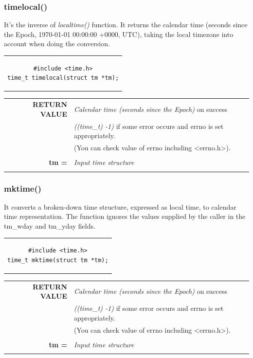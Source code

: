 \subsubsection{timelocal()}
It's the inverse of \textit{localtime()} function. It returns the calendar time (seconds since the Epoch, 1970-01-01 00:00:00 +0000, UTC), taking the local timezone into account when doing the conversion.
\begin{center}
\begin{tabular}{c}
\begin{lstlisting}[linewidth=170pt, basicstyle=\footnotesize\sffamily,]
#include <time.h>
time_t timelocal(struct tm *tm);
\end{lstlisting}
\end{tabular}
\end{center}

\begin{table}[H]
\centering\footnotesize
\begin{tabular}{rl}
\textbf{RETURN VALUE} & {\textit{Calendar time (seconds since the Epoch)} on success}\\
{} & {\textit{((time\_t) -1)} if some error occurs and errno is set appropriately.}\\
{} & {(You can check value of errno including <errno.h>).}\\
& \\
\textbf{tm =} & {\textit{Input time structure}}\\
& \\
\end{tabular}
\end{table}

\subsubsection{mktime()}
It converts a broken-down time structure, expressed as local time, to calendar time representation. The function ignores the values supplied by the caller in the tm\_wday and tm\_yday fields.
\begin{center}
\begin{tabular}{c}
\begin{lstlisting}[linewidth=180pt, basicstyle=\footnotesize\sffamily,]
#include <time.h>
time_t mktime(struct tm *tm);
\end{lstlisting}
\end{tabular}
\end{center}

\begin{table}[H]
\centering\footnotesize
\begin{tabular}{rl}
\textbf{RETURN VALUE} & {\textit{Calendar time (seconds since the Epoch)} on success}\\
{} & {\textit{((time\_t) -1)} if some error occurs and errno is set appropriately.}\\
{} & {(You can check value of errno including <errno.h>).}\\
& \\
\textbf{tm =} & {\textit{Input time structure}}\\
& \\
\end{tabular}
\end{table}

